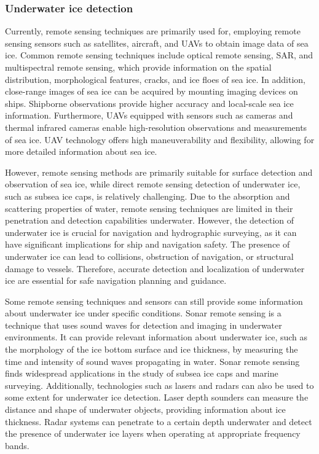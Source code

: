 \subsubsection{Underwater ice detection}
Currently, remote sensing techniques are primarily used for, employing remote sensing sensors such as satellites, aircraft, and UAVs to obtain image data of sea ice. Common remote sensing techniques include optical remote sensing, SAR, and multispectral remote sensing, which provide information on the spatial distribution, morphological features, cracks, and ice floes of sea ice. In addition, close-range images of sea ice can be acquired by mounting imaging devices on ships. Shipborne observations provide higher accuracy and local-scale sea ice information. Furthermore, UAVs equipped with sensors such as cameras and thermal infrared cameras enable high-resolution observations and measurements of sea ice. UAV technology offers high maneuverability and flexibility, allowing for more detailed information about sea ice.

However, remote sensing methods are primarily suitable for surface detection and observation of sea ice, while direct remote sensing detection of underwater ice, such as subsea ice caps, is relatively challenging. Due to the absorption and scattering properties of water, remote sensing techniques are limited in their penetration and detection capabilities underwater. However, the detection of underwater ice is crucial for navigation and hydrographic surveying, as it can have significant implications for ship and navigation safety. The presence of underwater ice can lead to collisions, obstruction of navigation, or structural damage to vessels. Therefore, accurate detection and localization of underwater ice are essential for safe navigation planning and guidance.

Some remote sensing techniques and sensors can still provide some information about underwater ice under specific conditions. Sonar remote sensing is a technique that uses sound waves for detection and imaging in underwater environments. It can provide relevant information about underwater ice, such as the morphology of the ice bottom surface and ice thickness, by measuring the time and intensity of sound waves propagating in water. Sonar remote sensing finds widespread applications in the study of subsea ice caps and marine surveying. Additionally, technologies such as lasers and radars can also be used to some extent for underwater ice detection. Laser depth sounders can measure the distance and shape of underwater objects, providing information about ice thickness. Radar systems can penetrate to a certain depth underwater and detect the presence of underwater ice layers when operating at appropriate frequency bands.

